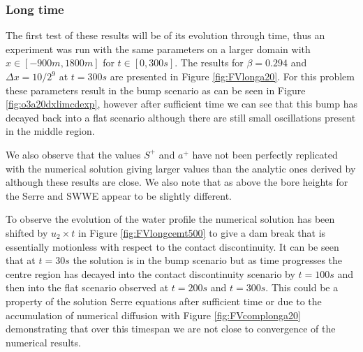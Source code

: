 \documentclass[SingleSpace,12pt,Proceedings]{Serre_ASCE}
\begin{document}
\subsubsection{Long time}\label{subsubsec:LT}
The first test of these results will be of its evolution through time, thus an experiment was run with the same parameters on a larger domain with $x \in [-900m, 1800m]$ for $t \in [0,300s]$. The results for $\beta = 0.294$ and $\Delta x = 10/2^{9}$ at $t = 300s$ are presented in Figure \ref{fig:FVlonga20}. For this problem these parameters result in the bump scenario as can be seen in Figure \ref{fig:o3a20dxlimcdexp}, however after sufficient time we can see that this bump has decayed back into a flat scenario although there are still small oscillations present in the middle region. 

We also observe that the values $S^+$ and $a^+$ have not been perfectly replicated with the numerical solution giving larger values than the analytic ones derived by  although these results are close. We also note that as above the bore heights for the Serre and SWWE appear to be slightly different.

To observe the evolution of the water profile the numerical solution has been shifted by $u_2  \times t$ in Figure \ref{fig:FVlongcemt500} to give a dam break that is essentially motionless with respect to the contact discontinuity. It can be seen that at $t =30s$ the solution is in the bump scenario but as time progresses the centre region has decayed into the contact discontinuity scenario by $t=100s$ and then into the flat scenario observed at $t=200s$ and $t=300s$. This could be a property of the solution Serre equations after sufficient time or due to the accumulation of numerical diffusion with Figure \ref{fig:FVcomplonga20} demonstrating that over this timespan we are not close to convergence of the numerical results.    
\end{document}
